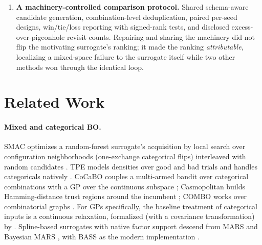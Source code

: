 \documentclass[%
 aip,
 amsmath,amssymb,
 floatfix,
 reprint,%
]{revtex4-1}
\begin{document}
\begin{enumerate}
  re-spent on known categorical combinations across every method family
  we tested. The second is the controlled twin of the waste measured in
  the wild.
  \item \textbf{A machinery-controlled comparison protocol.} Shared
  schema-aware candidate generation, combination-level deduplication,
  paired per-seed designs, win/tie/loss reporting with signed-rank
  tests, and disclosed excess-over-pigeonhole revisit counts. Repairing
  and sharing the machinery did not flip the motivating surrogate's
  ranking; it made the ranking \emph{attributable}, localizing a
  mixed-space failure to the surrogate itself while two other methods
  won through the identical loop.
\end{enumerate}

\section{Related Work}


\paragraph{Mixed and categorical BO.} SMAC optimizes a random-forest
surrogate's acquisition by local search over configuration neighborhoods
(one-exchange categorical flips) interleaved with random candidates
\cite{hutter2011sequential}. TPE models densities over good and bad trials and
handles categoricals natively \cite{bergstra2011algorithms, watanabe2023tree,
akiba2019optuna}. CoCaBO couples a multi-armed bandit over categorical
combinations with a GP over the continuous subspace \cite{ru2020cocabo};
Casmopolitan builds Hamming-distance trust regions around the incumbent
\cite{wan2021think}; COMBO works over combinatorial graphs \cite{oh2019combo}.
For GPs specifically, the baseline treatment of categorical inputs is a
continuous relaxation, formalized (with a covariance transformation) by
\citet{garrido2020dealing}. Spline-based surrogates with native factor support
descend from MARS and Bayesian MARS \cite{friedman1991multivariate,
denison1998bayesian}, with BASS as the modern implementation
\cite{francom2020bass}.
\end{document}

